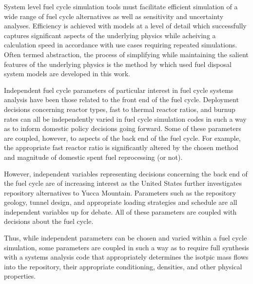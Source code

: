 System level fuel cycle simulation tools must facilitate efficient 
simulation of a wide range of fuel cycle alternatives as well as 
sensitivity and uncertainty analyses. Efficiency is achieved with 
models at a level of detail which successfully captures significant 
aspects of the underlying physics while acheiving a calculation speed 
in accordance with use cases requiring repeated simulations. Often 
termed abstraction, the process of simplifying while maintaining the 
salient features of the underlying physics is the method by which used 
fuel disposal system models are developed in this work. 


Independent fuel cycle parameters of particular interest in fuel cycle systems 
analysis have been those related to the front end of the fuel cycle. Deployment 
decisions concerning reactor types, fast to thermal reactor ratios, and burnup 
rates can all be independently varied in fuel cycle simulation codes in such a 
way as to inform domestic policy decisions going forward. Some of these 
parameters are coupled, however, to aspects of the back end of the fuel cycle. 
For example, the appropriate fast reactor ratio is significantly altered by the 
chosen method and magnitude of domestic spent fuel reprocessing (or not).


However, independent variables representing decisions concerning the back end
of the fuel cycle are of increasing interest as the United States further
investigates repository alternatives to Yucca Mountain.  Parameters such as the
repository geology, tunnel design, and appropriate loading strategies and
schedule are all independent variables up for debate. All of these
parameters are coupled with decisions about the fuel cycle. 


Thus, while independent parameters can be chosen and varied
within a fuel cycle simulation, some parameters are coupled in such a way as to
require full synthesis with a systems analysis code that appropriately
determines the isotpic mass flows into the repository, their appropriate
conditioning, densities, and other physical properties.  

